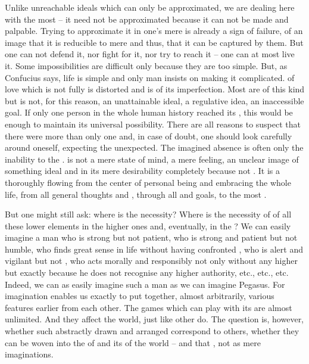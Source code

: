 Unlike unreachable ideals which can only be approximated, we are dealing here
with the most  -- it need not be approximated because it
can not be made  and palpable. Trying to approximate it in one's mere
 is already a sign of failure, of an image that it is reducible to mere
 and thus, that it can be captured by them. But one can not defend it, nor
fight for it, nor try to reach it -- one can at most live it. Some
impossibilities are difficult only because they are too simple. But, as
Confucius says, life is simple and only man insists on making it complicated.
 of love which is not fully  is distorted
and is  of its imperfection.  Most  are of this kind
but  is not, for this reason, an unattainable ideal, a regulative idea,
an inaccessible goal. If only one person in the whole human history reached its
, this would be enough to maintain its universal possibility.
There are all reasons to suspect that there were more than only one and, in case
of doubt, one should look carefully around oneself, {expecting the unexpected.}
The imagined absence is often only the inability to  the
.   is not a mere state of mind, a mere feeling,
an unclear image of something ideal and in its mere desirability completely
 because not . It is a thoroughly  flowing from the center of personal being and embracing the
whole life, from  all general thoughts and , through all
 and goals, to the most  .


\pa
But one might still ask: where is the necessity? Where is the necessity of
 of all these lower elements in the higher ones and,
eventually, in the  ? We
can easily imagine a man who is strong but not patient, who is strong and
patient but not humble, who finds great sense in life without having confronted
, who is alert and vigilant but not , who acts morally and
responsibly not only without any higher  but exactly because he 
does not recognise any higher authority, etc., etc., etc.
Indeed, we can as easily imagine such a man as we can imagine Pegasus. For
imagination enables us exactly to put together, almost arbitrarily, various
features earlier  from each other. The games which
 can play with its  are almost
unlimited. And they affect the world, just like other  do. The
question is, however, whether such abstractly drawn  and
arranged  correspond
to others, whether they can be woven into the  of  and
its  of the world -- and that , not as mere
imaginations.

